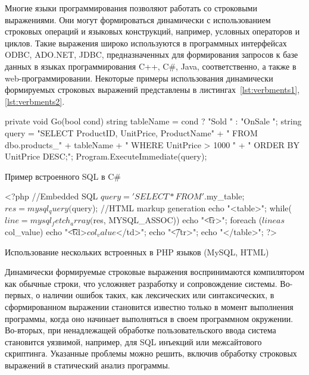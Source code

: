 \documentclass[10pt, conference, compsocconf]{IEEEtran}
\begin{document}
Многие языки программирования позволяют работать со строковыми выражениями. Они могут формироваться динамически с использованием строковых операций и языковых конструкций, например, условных операторов и циклов. Такие выражения широко используются в программных интерфейсах ODBC, ADO.NET, JDBC, предназначенных для формирования запросов к базе данных в языках программирования C++, C\#, Java, соответственно, а также в web-программировании. Некоторые примеры использования динамически формируемых строковых выражений представлены в листингах~\ref{lst:verbments1}, \ref{lst:verbments2}. 

\begin{listing}[h]
\begin{pyglist}[language=csharp,numbers=none,numbersep=5pt]
 private void Go(bool cond)
 {
   string tableName = cond ? "Sold " : "OnSale ";
   string query =
       "SELECT ProductID, UnitPrice, ProductName" 
           + " FROM dbo.products_" + tableName
           + " WHERE UnitPrice > 1000 "
           + " ORDER BY UnitPrice DESC;";
   Program.ExecuteImmediate(query);
 }
\end{pyglist}
\caption{Пример встроенного SQL в C\#}
\label{lst:verbments1}
\end{listing}


\begin{listing}[h]
\begin{pyglist}[language=php,numbers=none,numbersep=5pt]
<?php
//Embedded SQL
$query = 'SELECT * FROM '. $my_table;
$res = mysql_query($query);
//HTML markup generation
echo "<table>\n";
while($line=mysql_fetch_array($res, MYSQL_ASSOC)){
echo "\t<tr>\n";	
foreach ($line as $col_value){
echo "\t\t<td>$col_value$</td>\n";}
echo "\t</tr>\n";}
echo "</table>\n";
?>
\end{pyglist}
\caption{Использование нескольких встроенных в PHP языков (MySQL, HTML)}
\label{lst:verbments2}
\end{listing}


Динамически формируемые строковые выражения воспринимаются компилятором как обычные строки, что усложняет разработку и сопровождение системы. Во-первых, о наличии ошибок таких, как лексических или синтаксических, в сформированном выражении становится известно только в момент выполнения программы, когда оно начинает выполняться в своем программном окружении. Во-вторых,  при ненадлежащей обработке пользовательского ввода система становится уязвимой, например, для SQL инъекций или межсайтового скриптинга. Указанные проблемы можно решить, включив обработку строковых выражений в статический анализ программы. 
\end{document}

